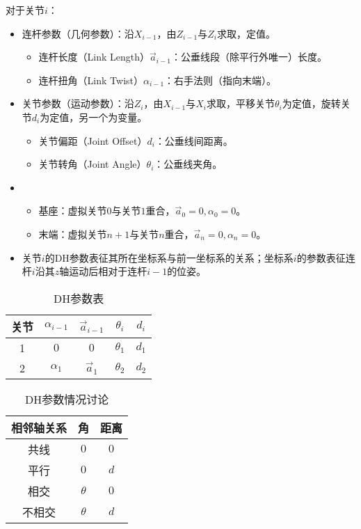 \documentclass[
12pt, %
a4paper, 
oneside, %
headinclude,footinclude, %
]{scrartcl}
\begin{document}
对于关节$ i $：
\begin{itemize}
\item 连杆参数（几何参数）：沿$ X_{i - 1} $，由$ Z_{i - 1} $与$ Z_i $求取，定值。
\begin{itemize}
\item 连杆长度（Link Length）$ \vec{a}_{i - 1} $：公垂线段（除平行外唯一）长度。
\item 连杆扭角（Link Twist）$ \alpha_{i - 1} $：右手法则（指向末端）。
\end{itemize}
\item 关节参数（运动参数）：沿$ Z_i $，由$ X_{i - 1} $与$ X_i $求取，平移关节$ \theta_i $为定值，旋转关节$ d_i $为定值，另一个为变量。
\begin{itemize}
\item 关节偏距（Joint Offset）$ d_i $：公垂线间距离。
\item 关节转角（Joint Angle）$ \theta_i $：公垂线夹角。
\end{itemize}
\item 
\begin{itemize}
\item 基座：虚拟关节$ 0 $与关节$ 1 $重合，$ \vec{a}_0 = 0, \alpha_0 = 0 $。
\item 末端：虚拟关节$ n + 1 $与关节$ n $重合，$ \vec{a}_n = 0, \alpha_n = 0 $。
\end{itemize}
\item 关节$ i $的DH参数表征其所在坐标系与前一坐标系的关系；坐标系$ i $的参数表征连杆$ i $沿其$ z $轴运动后相对于连杆$ i - 1 $的位姿。
\end{itemize}
\begin{minipage}{0.5\textwidth}
\begin{table}[H]
\centering
\begin{tabular}{c|cccc}
\hline
关节 & $ \alpha_{i - 1} $ & $ \vec{a}_{i - 1} $ & $ \theta_i $ & $ d_i $ \\
\hline
1 & $ 0 $ & $ 0 $ & $ \theta_1 $ & $ d_1 $ \\
2 & $ \alpha_1 $ & $ \vec a_1 $ & $ \theta_2 $ & $ d_2 $ \\
\hline
\end{tabular}
\caption{DH参数表}
\end{table}
\end{minipage}
\begin{minipage}{0.5\textwidth}
\begin{table}[H]
\centering
\begin{tabular}{c|cc}
\hline
相邻轴关系 & 角 & 距离 \\
\hline
共线 & $ 0 $ & $ 0 $ \\
平行 & $ 0 $ & $ d $ \\
相交 & $ \theta $ & $ 0 $ \\
不相交 & $ \theta $ & $ d $ \\
\hline
\end{tabular}
\caption{DH参数情况讨论}
\end{table}
\end{minipage}
\end{document}
